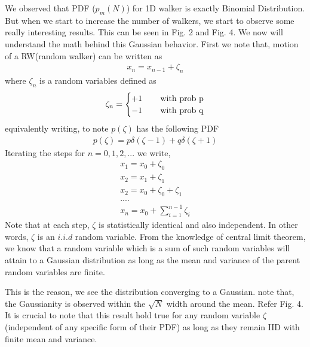 \documentclass[showpacs,amsmath,amssymb,aps,pre,twocolumn]{revtex4-1}
\begin{document}
We observed that PDF ($p_m(N)$) for 1D walker is exactly Binomial Distribution. But when we start to increase the number of walkers, we start to observe some really interesting results. This can be seen in Fig. 2 and Fig. 4.
We now will understand the math behind this Gaussian behavior. 
First we note that, motion of a RW(random walker) can be written as \\
\begin{align}
    x_n = x_{n-1} + \zeta _n
\end{align}
where $\zeta _n$ is a random variables defined as 
\begin{align}
\zeta _n =\begin{cases}
          +1 \quad & \,  \textnormal{with prob p} \\
          -1 \quad & \,  \textnormal{with prob q}  \\
     \end{cases}
\end{align}
equivalently writing, to note $p(\zeta)$ has the following PDF
\begin{align}
    p(\zeta) = p \delta(\zeta -1) + q\delta (\zeta + 1)
\end{align}
Iterating the steps for $n= 0,1,2,...$ we write, 
\begin{align}
    x_1 = x_0 + \zeta _0 \\
    x_2 = x_1 + \zeta _1 \\
    x_2 = x_0 + \zeta _0 + \zeta _1\\
    ....\\
    x_n = x_0 + \sum_{i = 1}^{n-1} \zeta _i
\end{align}
Note that at each step, $\zeta$ is statistically identical and also independent. In other words, $\zeta$ is an $i.i.d$ random variable. 
From the knowledge of central limit theorem, we know that a random variable which is a sum of such random variables will attain to a Gaussian distribution as long as the mean and variance of the parent random variables are finite.

This is the reason, we see the distribution converging to a Gaussian. note that, the Gaussianity is observed within the $\sqrt{N}$ width around the mean. Refer Fig. 4. It is crucial to note that this result hold true for any random variable $\zeta$ (independent of any specific form of their PDF) as long as  they remain IID with finite mean and variance.
\end{document}
